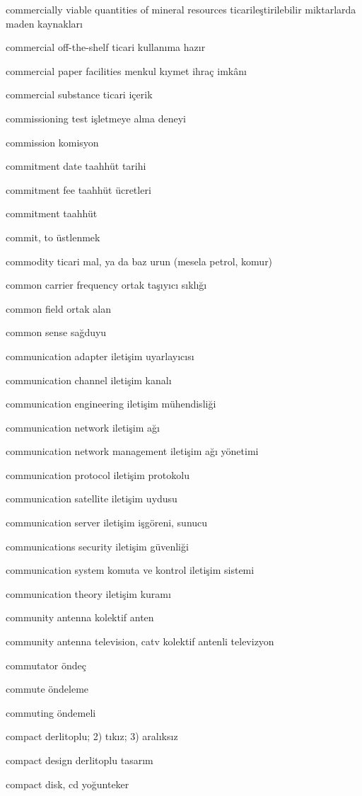 \documentclass[12pt,fleqn]{article}\usepackage{../../common}
\begin{document}
commercially viable quantities of mineral resources ticarileştirilebilir miktarlarda maden kaynakları

commercial off-the-shelf ticari kullanıma hazır

commercial paper facilities menkul kıymet ihraç imkânı

commercial substance ticari içerik

commissioning test işletmeye alma deneyi

commission komisyon

commitment date taahhüt tarihi

commitment fee taahhüt ücretleri

commitment taahhüt

commit, to üstlenmek

commodity ticari mal, ya da baz urun (mesela petrol, komur)

common carrier frequency ortak taşıyıcı sıklığı

common field ortak alan

common sense sağduyu

communication adapter iletişim uyarlayıcısı

communication channel iletişim kanalı

communication engineering iletişim mühendisliği

communication network iletişim ağı

communication network management iletişim ağı yönetimi

communication protocol iletişim protokolu

communication satellite iletişim uydusu

communication server iletişim işgöreni, sunucu

communications security iletişim güvenliği

communication system komuta ve kontrol iletişim sistemi

communication theory iletişim kuramı

community antenna kolektif anten

community antenna television, catv kolektif antenli televizyon

commutator öndeç

commute öndeleme

commuting öndemeli

compact derlitoplu; 2) tıkız; 3) aralıksız

compact design derlitoplu tasarım

compact disk, cd yoğunteker
\end{document}
